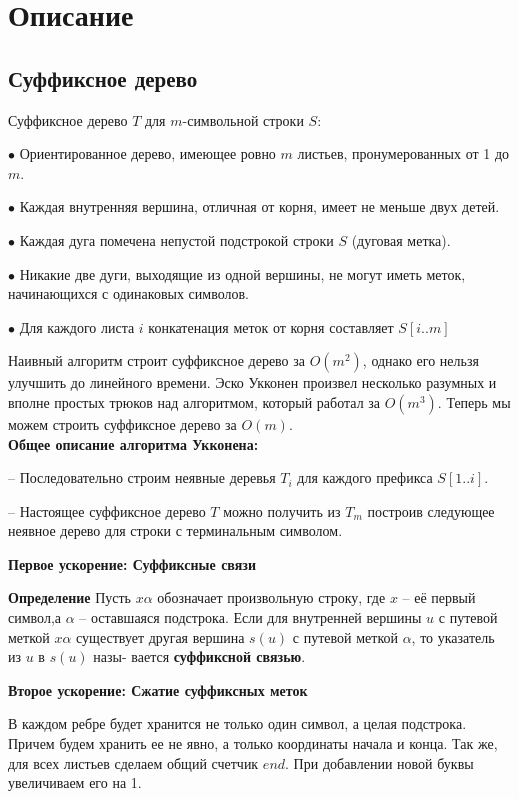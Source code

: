 \section{Описание}

\subsection*{Суффиксное дерево}

Суффиксное дерево $T$ для $m$-символьной строки $S$:

$\bullet$ Ориентированное дерево, имеющее
ровно $m$ листьев, пронумерованных от 1 до $m$.

$\bullet$ Каждая внутренняя вершина, отличная
от корня, имеет не меньше двух детей.

$\bullet$ Каждая дуга помечена непустой
подстрокой строки $S$ (дуговая метка).

$\bullet$ Никакие две дуги, выходящие из одной
вершины, не могут иметь меток,
начинающихся с одинаковых символов.

$\bullet$ Для каждого листа $i$ конкатенация
меток от корня составляет $S[i..m]$



Наивный алгоритм строит суффиксное дерево за $O(m^2)$, однако его нельзя улучшить до линейного времени. Эско Укконен произвел несколько разумных и вполне простых трюков над алгоритмом, который работал за $O(m^3)$. Теперь мы можем строить суффиксное дерево за $O(m)$.
\\

\textbf{Общее описание алгоритма Укконена:}

-- Последовательно строим неявные деревья $T_i$ для каждого
префикса $S[1..i]$.

-- Настоящее суффиксное дерево $T$ можно получить из $T_m$
построив следующее неявное дерево для строки с терминальным символом.

\textbf{Первое ускорение: Суффиксные связи}

\textbf{Определение} Пусть $x\alpha$ обозначает произвольную строку, где $x$ -- её первый символ,а $\alpha$ -- оставшаяся подстрока. Если для внутренней вершины $u$ с путевой меткой $x\alpha$ существует другая вершина $s(u)$ с путевой меткой $\alpha$, то указатель из $u$ в $s(u)$ назы-
вается \textbf{суффиксной связью}.

\textbf{Второе ускорение: Сжатие суффиксных меток}

В каждом ребре будет хранится не только один символ, а целая подстрока. Причем будем хранить ее не явно, а только координаты начала и конца. Так же, для всех листьев сделаем общий счетчик $end$. При добавлении новой буквы увеличиваем его на 1.

